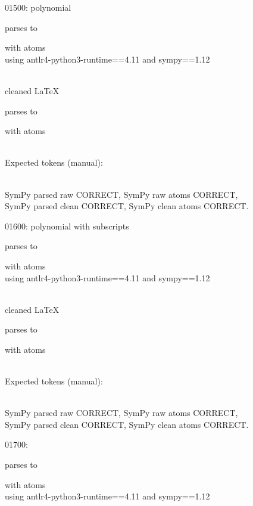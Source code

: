 \documentclass{article}
\begin{document}
\hrulefill

01500:
polynomial
    
parses to

with atoms 
\\
using antlr4-python3-runtime==4.11 and sympy==1.12

\ \\
cleaned \LaTeX

parses to

with atoms



\ \\
Expected tokens (manual): 



\ \\
SymPy parsed raw CORRECT, 
SymPy raw atoms CORRECT, \\
SymPy parsed clean CORRECT, 
SymPy clean atoms CORRECT.

\hrulefill

01600:
polynomial with subscripts
  
parses to

with atoms 
\\
using antlr4-python3-runtime==4.11 and sympy==1.12

\ \\
cleaned \LaTeX

parses to

with atoms


\ \\
Expected tokens (manual):


\ \\
SymPy parsed raw CORRECT, 
SymPy raw atoms CORRECT, \\
SymPy parsed clean CORRECT, 
SymPy clean atoms CORRECT.

\hrulefill

01700:

parses to

with atoms 
\\
using antlr4-python3-runtime==4.11 and sympy==1.12
\end{document}
